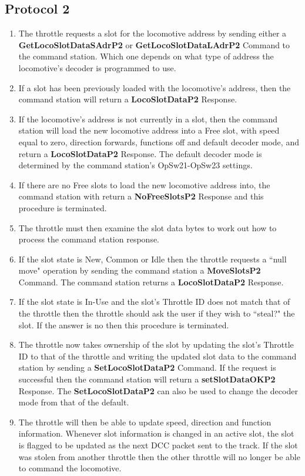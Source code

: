 \subsection{Protocol 2}

\begin{enumerate}
\item The throttle requests a slot for the locomotive \gls{address} by sending either a \textbf{GetLocoSlotDataSAdrP2} or \textbf{GetLocoSlotDataLAdrP2} \gls{Command} to the command station. Which one depends on what type of address the locomotive's decoder is programmed to use. 
\item If a slot has been previously loaded with the locomotive's address, then the command station will return a \textbf{LocoSlotDataP2} \gls{Response}.
\item If the locomotive's address is not currently in a slot, then the command station will load the new locomotive address into a Free slot, with speed equal to zero, direction forwards, functions off and default decoder mode, and return a \textbf{LocoSlotDataP2} \gls{Response}. The default decoder mode is determined by the command station's OpSw21-OpSw23 settings.
\item If there are no Free slots to load the new locomotive address into, the command station with return a \textbf{NoFreeSlotsP2} \gls{Response} and this procedure is terminated.
\item The throttle must then examine the slot data bytes to work out how to process the command station response.
\item If the slot state is New, Common or Idle then the throttle requests a ``null move" operation by sending the command station a \textbf{MoveSlotsP2} \gls{Command}. The command station returns a \textbf{LocoSlotDataP2} \gls{Response}. 
\item If the slot state is In-Use and the slot's \gls{Throttle ID} does not match that of the throttle then the throttle should ask the user if they wish to ``steal?" the slot. If the answer is no then this procedure is terminated.
\item The throttle now takes ownership of the slot by updating the slot's Throttle ID to that of the throttle and writing the updated slot data to the command station by sending a \textbf{SetLocoSlotDataP2} \gls{Command}. If the request is successful then the command station will return a \textbf{setSlotDataOKP2} \gls{Response}. The \textbf{SetLocoSlotDataP2} can also be used to change the decoder mode from that of the default.
\item The throttle will then be able to update speed, direction and function information. Whenever slot information is changed in an active slot, the slot is flagged to be updated as the next DCC packet sent to the track. If the slot was stolen from another throttle then the other throttle will no longer be able to command the locomotive.
\end{enumerate}

